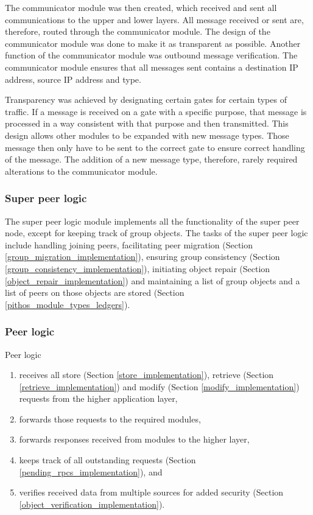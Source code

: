 The communicator module was then created, which received and sent all communications to the upper and lower layers. All message received or sent are, therefore, routed through the communicator module. The design of the communicator module was done to make it as transparent as possible. Another function of the communicator module was outbound message verification. The communicator module ensures that all messages sent contains a destination IP address, source IP address and type.

Transparency was achieved by designating certain gates for certain types of traffic. If a message is received on a gate with a specific purpose, that message is processed in a way consistent with that purpose and then transmitted. This design allows other modules to be expanded with new message types. Those message then only have to be sent to the correct gate to ensure correct handling of the message. The addition of a new message type, therefore, rarely required alterations to the communicator module.

\subsubsection{Super peer logic}
\label{pithos_module_types_sp_logic}

The super peer logic module implements all the functionality of the super peer node, except for keeping track of group objects. The tasks of the super peer logic include handling joining peers, facilitating peer migration (Section \ref{group_migration_implementation}), ensuring group consistency (Section \ref{group_consistency_implementation}), initiating object repair (Section \ref{object_repair_implementation}) and maintaining a list of group objects and a list of peers on those objects are stored (Section \ref{pithos_module_types_ledgers}).

\subsubsection{Peer logic}

Peer logic
\begin{enumerate}
  \item  receives all store (Section \ref{store_implementation}), retrieve (Section \ref{retrieve_implementation}) and modify (Section \ref{modify_implementation}) requests from the higher application layer,
  \item forwards those requests to the required modules,
  \item forwards responses received from modules to the higher layer,
  \item keeps track of all outstanding requests (Section \ref{pending_rpcs_implementation}), and
  \item verifies received data from multiple sources for added security (Section \ref{object_verification_implementation}).
\end{enumerate}

